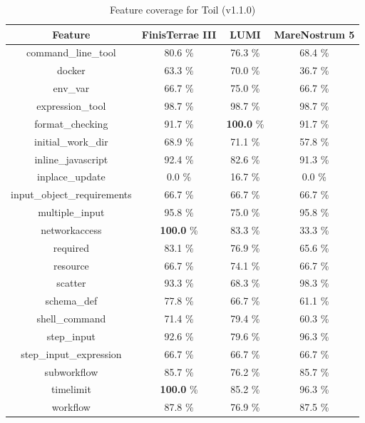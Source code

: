 \documentclass{article}
\begin{document}
\begin{table}[ht!]
\centering
\setlength{\tabcolsep}{6pt}
\renewcommand{\arraystretch}{1.2}
\begin{tabular}{|c|c|c|c|}
\hline
\rowcolor{lightgray!50}
\textbf{Feature} & \textbf{FinisTerrae III} & \textbf{LUMI} & \textbf{MareNostrum 5} \\
\hline
command\_line\_tool & 80.6 \% & 76.3 \% & 68.4 \% \\
docker & 63.3 \% & 70.0 \% & 36.7 \% \\
env\_var & 66.7 \% & 75.0 \% & 66.7 \% \\
expression\_tool & 98.7 \% & 98.7 \% & 98.7 \% \\
format\_checking & 91.7 \% & \textbf{100.0} \% & 91.7 \% \\
initial\_work\_dir & 68.9 \% & 71.1 \% & 57.8 \% \\
inline\_javascript & 92.4 \% & 82.6 \% & 91.3 \% \\
inplace\_update & 0.0 \% & 16.7 \% & 0.0 \% \\
input\_object\_requirements & 66.7 \% & 66.7 \% & 66.7 \% \\
multiple\_input & 95.8 \% & 75.0 \% & 95.8 \% \\
networkaccess & \textbf{100.0} \% & 83.3 \% & 33.3 \% \\
required & 83.1 \% & 76.9 \% & 65.6 \% \\
resource & 66.7 \% & 74.1 \% & 66.7 \% \\
scatter & 93.3 \% & 68.3 \% & 98.3 \% \\
schema\_def & 77.8 \% & 66.7 \% & 61.1 \% \\
shell\_command & 71.4 \% & 79.4 \% & 60.3 \% \\
step\_input & 92.6 \% & 79.6 \% & 96.3 \% \\
step\_input\_expression & 66.7 \% & 66.7 \% & 66.7 \% \\
subworkflow & 85.7 \% & 76.2 \% & 85.7 \% \\
timelimit & \textbf{100.0} \% & 85.2 \% & 96.3 \% \\
workflow & 87.8 \% & 76.9 \% & 87.5 \% \\
\hline
\end{tabular}
\caption{Feature coverage for Toil (v1.1.0)}
\label{tab:toil_feat_v11}
\end{table}
\end{document}
